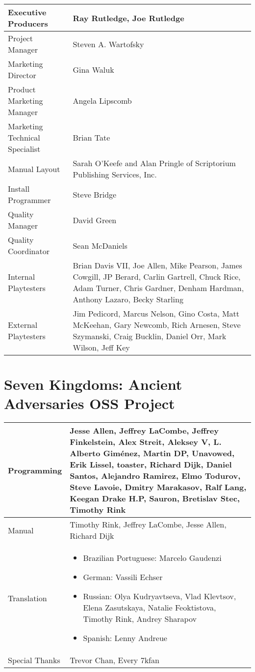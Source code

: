 \begin{tabular}{ | p{4cm} | p{9cm} |}
	\hline
	Executive Producers	& Ray Rutledge, Joe Rutledge \\ \hline
Project Manager	& Steven A. Wartofsky \\ \hline
Marketing Director	& Gina Waluk \\ \hline
Product Marketing Manager	& Angela Lipscomb \\ \hline
Marketing Technical Specialist	& Brian Tate \\ \hline
Manual Layout	& Sarah O’Keefe and Alan Pringle of Scriptorium Publishing Services, Inc. \\ \hline
Install Programmer	& Steve Bridge \\ \hline
Quality Manager	& David Green \\ \hline
Quality Coordinator	& Sean McDaniels \\ \hline
Internal Playtesters	& Brian Davis VII, Joe Allen, Mike Pearson, James Cowgill, JP Berard, Carlin Gartrell, Chuck Rice, Adam Turner, Chris Gardner, Denham Hardman, Anthony Lazaro, Becky Starling \\ \hline
External Playtesters	& Jim Pedicord, Marcus Nelson, Gino Costa, Matt McKeehan, Gary Newcomb, Rich Arnesen, Steve Szymanski, Craig Bucklin, Daniel Orr, Mark Wilson, Jeff Key \\ \hline
	\hline
\end{tabular}

\section{Seven Kingdoms: Ancient Adversaries OSS Project}

\begin{tabular}{ | p{4cm} | p{9cm} |}
	\hline
	Programming	& Jesse Allen, Jeffrey LaCombe, Jeffrey Finkelstein, Alex Streit, Aleksey V, L. Alberto Giménez, Martin DP, Unavowed, Erik Lissel, toaster, Richard Dijk, Daniel Santos, Alejandro Ramirez, Elmo Todurov, Steve Lavoie, Dmitry Marakasov, Ralf Lang, Keegan Drake H.P, Sauron, Bretislav Stec, Timothy Rink \\ \hline
Manual & Timothy Rink, Jeffrey LaCombe, Jesse Allen, Richard Dijk \\ \hline
Translation	& 
\begin{itemize}
\item Brazilian Portuguese: Marcelo Gaudenzi
\item German: Vassili Echser
\item Russian: Olya Kudryavtseva, Vlad Klevtsov, Elena Zasutskaya, Natalie Feoktistova, Timothy Rink, Andrey Sharapov
\item Spanish: Lenny Andreue
\end{itemize}
 \\ \hline
Special Thanks & Trevor Chan, Every 7kfan \\ \hline
	\hline
\end{tabular}
